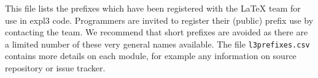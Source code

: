 \documentclass{article}
\begin{document}
This file lists the prefixes which have been registered with the \LaTeX{}
team for use in \textsf{expl3} code. Programmers are invited to register their
(public) prefix use by contacting the team. We recommend that short prefixes
are avoided as there are a limited number of these very general names available.
The file \texttt{l3prefixes.csv} contains more details on each module, for
example any information on source repository or issue tracker.

\PrintTable
\end{document}
